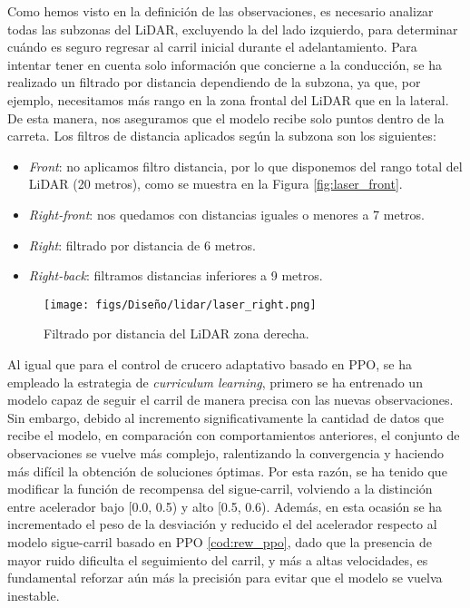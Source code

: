 \newpage

Como hemos visto en la definición de las observaciones, es necesario analizar todas las subzonas del \ac{LiDAR}, excluyendo la del lado izquierdo, para determinar cuándo es seguro regresar al carril inicial durante el adelantamiento. Para intentar tener en cuenta solo información que concierne a la conducción, se ha realizado un filtrado por distancia dependiendo de la subzona, ya que, por ejemplo, necesitamos más rango en la zona frontal del \ac{LiDAR} que en la lateral. De esta manera, nos aseguramos que el modelo recibe solo puntos dentro de la carreta. Los filtros de distancia aplicados según la subzona son los siguientes:
\begin{itemize}
\item \textit{Front}: no aplicamos filtro distancia, por lo que disponemos del rango total del \ac{LiDAR} (20 metros), como se muestra en la Figura \ref{fig:laser_front}.
\item \textit{Right-front}: nos quedamos con distancias iguales o menores a 7 metros.
\item \textit{Right}: filtrado por distancia de 6 metros.
\item \textit{Right-back}: filtramos distancias inferiores a 9 metros.
\end{itemize}

\begin{figure}[ht]
\centering
\texttt{[image: figs/Diseño/lidar/laser\_right.png]}
\caption{Filtrado por distancia del \ac{LiDAR} zona derecha.}
\label{fig:laser_right}
\end{figure}

\newpage

Al igual que para el control de crucero adaptativo basado en \ac{PPO}, se ha empleado la estrategia de \textit{curriculum learning}, primero se ha entrenado un modelo capaz de seguir el carril de manera precisa con las nuevas observaciones. Sin embargo, debido al incremento significativamente la cantidad de datos que recibe el modelo, en comparación con comportamientos anteriores, el conjunto de observaciones se vuelve más complejo, ralentizando la convergencia y haciendo más difícil la obtención de soluciones óptimas. Por esta razón, se ha tenido que modificar la función de recompensa del sigue-carril, volviendo a la distinción entre acelerador bajo [0.0, 0.5) y alto [0.5, 0.6). Además, en esta ocasión se ha incrementado el peso de la desviación y reducido el del acelerador respecto al modelo sigue-carril basado en \ac{PPO} \ref{cod:rew_ppo}, dado que la presencia de mayor ruido dificulta el seguimiento del carril, y más a altas velocidades, es fundamental reforzar aún más la precisión para evitar que el modelo se vuelva inestable.

